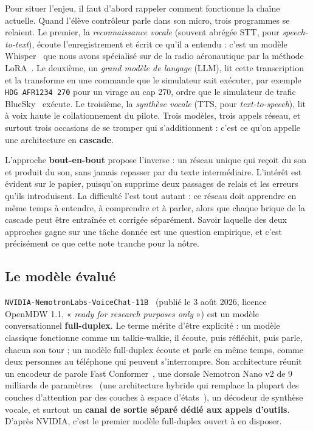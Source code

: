 \documentclass[11pt,a4paper]{article}
\begin{document}
Pour situer l'enjeu, il faut d'abord rappeler comment fonctionne la chaîne
actuelle. Quand l'élève contrôleur parle dans son micro, trois programmes se
relaient. Le premier, la \emph{reconnaissance vocale} (souvent abrégée STT, pour
\emph{speech-to-text}), écoute l'enregistrement et écrit ce qu'il a entendu :
c'est un modèle Whisper~\cite{whisper} que nous avons spécialisé sur de la
radio aéronautique par la méthode LoRA~\cite{lora}. Le deuxième, un \emph{grand modèle de langage} (LLM), lit cette
transcription et la transforme en une commande que le simulateur sait exécuter,
par exemple \texttt{HDG AFR1234 270} pour un virage au cap 270, ordre que le
simulateur de trafic BlueSky~\cite{bluesky} exécute. Le troisième, la
\emph{synthèse vocale} (TTS, pour \emph{text-to-speech}), lit à voix haute le
collationnement du pilote. Trois modèles, trois appels réseau, et surtout trois
occasions de se tromper qui s'additionnent : c'est ce qu'on appelle une
architecture en \textbf{cascade}.

L'approche \textbf{bout-en-bout} propose l'inverse : un réseau unique qui reçoit
du son et produit du son, sans jamais repasser par du texte intermédiaire.
L'intérêt est évident sur le papier, puisqu'on supprime deux passages de relais
et les erreurs qu'ils introduisent. La difficulté l'est tout autant : ce réseau
doit apprendre en même temps à entendre, à comprendre et à parler, alors que
chaque brique de la cascade peut être entraînée et corrigée séparément. Savoir
laquelle des deux approches gagne sur une tâche donnée est une question
empirique, et c'est précisément ce que cette note tranche pour la nôtre.

\subsection{Le modèle évalué}

\texttt{NVIDIA-NemotronLabs-VoiceChat-11B}~\cite{voicechat11b} (publié le
3 août 2026, licence OpenMDW 1.1, « \emph{ready for research purposes only} ») est un modèle
conversationnel \textbf{full-duplex}. Le terme mérite d'être explicité : un
modèle classique fonctionne comme un talkie-walkie, il écoute, puis réfléchit,
puis parle, chacun son tour ; un modèle full-duplex écoute et parle en même
temps, comme deux personnes au téléphone qui peuvent s'interrompre. Son
architecture réunit un encodeur de parole Fast Conformer~\cite{fastconformer},
une dorsale Nemotron Nano v2 de 9 milliards de paramètres~\cite{nemotronnano2}
(une architecture hybride qui remplace la plupart des couches d'attention par
des couches à espace d'états~\cite{mamba2}), un décodeur de synthèse vocale, et surtout un
\textbf{canal de sortie séparé dédié aux appels d'outils}. D'après NVIDIA,
c'est le premier modèle full-duplex ouvert à en disposer.
\end{document}
